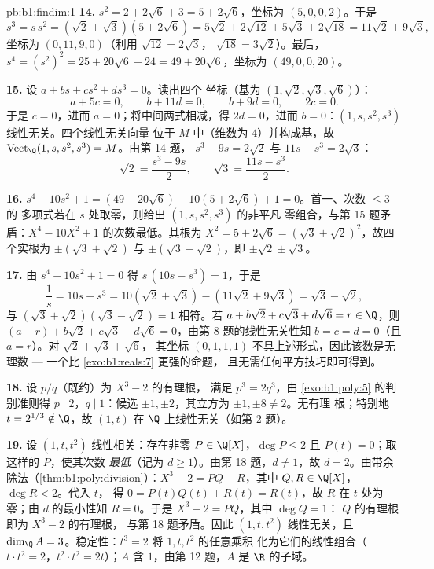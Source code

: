 \begin{solution}{pb:b1:findim:1}
\textbf{14.} $s^2 = 2 + 2\sqrt6 + 3 = 5 + 2\sqrt6$，坐标为
$(5, 0, 0, 2)$。于是
\[
s^3 = s\,s^2 = (\sqrt2 + \sqrt3)(5 + 2\sqrt6)
= 5\sqrt2 + 2\sqrt{12} + 5\sqrt3 + 2\sqrt{18}
= 11\sqrt2 + 9\sqrt3 ,
\]
坐标为 $(0, 11, 9, 0)$（利用 $\sqrt{12} = 2\sqrt3$，
$\sqrt{18} = 3\sqrt2$）。最后，$s^4 = (s^2)^2 = 25 + 20\sqrt6 +
24 = 49 + 20\sqrt6$，坐标为 $(49, 0, 0, 20)$。

\textbf{15.} 设 $a + bs + cs^2 + ds^3 = 0$。读出四个
坐标（基为 $(1, \sqrt2, \sqrt3, \sqrt6)$）：
\[
a + 5c = 0,\qquad b + 11d = 0,\qquad b + 9d = 0,\qquad 2c = 0 .
\]
于是 $c = 0$，进而 $a = 0$；将中间两式相减，得 $2d =
0$，进而 $b = 0$：$(1, s, s^2, s^3)$ 线性无关。四个线性无关向量
位于 $M$ 中（维数为 $4$）并构成基，故
$\operatorname{Vect}_\Q(1, s, s^2, s^3) = M$。由第 14 题，
$s^3 - 9s = 2\sqrt2$ 与 $11s - s^3 = 2\sqrt3$：
\[
\sqrt2 = \frac{s^3 - 9s}{2},
\qquad
\sqrt3 = \frac{11s - s^3}{2} .
\]

\textbf{16.} $s^4 - 10s^2 + 1 = (49 + 20\sqrt6) - 10(5 +
2\sqrt6) + 1 = 0$。首一、次数 $\leq 3$ 的
多项式若在 $s$ 处取零，则给出 $(1, s, s^2, s^3)$ 的非平凡
零组合，与第 15 题矛盾：$X^4 - 10X^2 + 1$
的次数最低。其根为 $X^2 = 5 \pm 2\sqrt6 = (\sqrt3 \pm
\sqrt2)^2$，故四个实根为 $\pm(\sqrt3 + \sqrt2)$ 与
$\pm(\sqrt3 - \sqrt2)$，即 $\pm\sqrt2 \pm \sqrt3$。

\textbf{17.} 由 $s^4 - 10s^2 + 1 = 0$ 得 $s\,(10s - s^3) = 1$，于是
\[
\frac1s = 10s - s^3 = 10(\sqrt2 + \sqrt3) - (11\sqrt2 + 9\sqrt3)
= \sqrt3 - \sqrt2 ,
\]
与 $(\sqrt3 + \sqrt2)(\sqrt3 - \sqrt2) = 1$ 相符。若 $a +
b\sqrt2 + c\sqrt3 + d\sqrt6 = r \in \Q$，则 $(a - r) + b\sqrt2
+ c\sqrt3 + d\sqrt6 = 0$，由第 8 题的线性无关性知 $b = c
= d = 0$（且 $a = r$）。对 $\sqrt2 + \sqrt3 + \sqrt6$，
其坐标 $(0, 1, 1, 1)$ 不具上述形式，因此该数是无理数 ---
一个比 \cref{exo:b1:reals:7} 更强的命题，
且无需任何平方技巧即可得到。

\textbf{18.} 设 $p/q$（既约）为 $X^3 - 2$ 的有理根，
满足 $p^3 = 2q^3$，由
\cref{exo:b1:poly:5} 的判别准则得 $p \mid 2$，$q \mid 1$：候选
$\pm1, \pm2$，其立方为 $\pm1, \pm8 \neq 2$。无有理
根；特别地 $t = 2^{1/3} \notin \Q$，故 $(1, t)$ 在
$\Q$ 上线性无关（如第 2 题）。

\textbf{19.} 设 $(1, t, t^2)$ 线性相关：存在非零 $P \in
\Q[X]$，$\deg P \leq 2$ 且 $P(t) = 0$；取这样的 $P$，使其次数
\emph{最低}（记为 $d \geq 1$）。由第 18 题，$d \neq 1$，故 $d
= 2$。由带余除法（\cref{thm:b1:poly:division}）：$X^3 - 2
= PQ + R$，其中 $Q, R \in \Q[X]$，$\deg R < 2$。代入 $t$，
得 $0 = P(t)Q(t) + R(t) = R(t)$，故 $R$ 在 $t$ 处为零；由
$d$ 的最小性知 $R = 0$。于是 $X^3 - 2 = PQ$，其中 $\deg Q = 1$：
$Q$ 的有理根即为 $X^3 - 2$ 的有理根，
与第 18 题矛盾。因此 $(1, t, t^2)$ 线性无关，且
$\dim_\Q A = 3$。稳定性：$t^3 = 2$ 将 $1, t, t^2$ 的任意乘积
化为它们的线性组合（$t\cdot t^2 = 2$，$t^2\cdot
t^2 = 2t$）；$A$ 含 $1$，由第 12 题，$A$ 是
$\R$ 的子域。


\end{solution}
